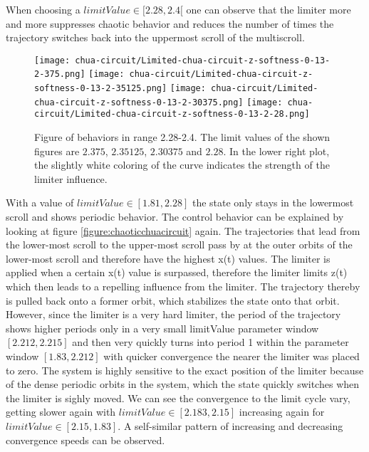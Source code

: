 \documentclass[main]{subfiles}
\begin{document}
When choosing a \(limitValue \in [2.28,2.4[\) one can observe that the limiter more and more suppresses chaotic behavior and reduces the number of times the trajectory switches back into the uppermost scroll of the multiscroll.

\begin{figure}[H]
\centering
\texttt{[image: chua-circuit/Limited-chua-circuit-z-softness-0-13-2-375.png]}
\texttt{[image: chua-circuit/Limited-chua-circuit-z-softness-0-13-2-35125.png]}
\texttt{[image: chua-circuit/Limited-chua-circuit-z-softness-0-13-2-30375.png]}
\texttt{[image: chua-circuit/Limited-chua-circuit-z-softness-0-13-2-28.png]}
\caption[Figure of behaviors in range 2.28-2.4]{Figure of behaviors in range 2.28-2.4. The limit values of the shown figures are \(2.375\), \(2.35125\), \(2.30375\) and \(2.28\). In the lower right plot, the slightly white coloring of the curve indicates the strength of the limiter influence.}
\label{figure:z-2.28-2.4-chaotictrajectories}
\end{figure}

With a value of \(limitValue \in [1.81, 2.28]\) the state only stays in the lowermost scroll and shows periodic behavior. The control behavior can be explained by looking at figure \ref{figure:chaoticchuacircuit} again. The trajectories that lead from the lower-most scroll to the upper-most scroll pass by at the outer orbits of the lower-most scroll and therefore have the highest x(t) values. The limiter is applied when a certain x(t) value is surpassed, therefore the limiter limits z(t) which then leads to a repelling influence from the limiter. The trajectory thereby is pulled back onto a former orbit, which stabilizes the state onto that orbit. However, since the limiter is a very hard limiter, the period of the trajectory shows higher periods only in a very small limitValue parameter window \([2.212,2.215]\) and then very quickly turns into period 1 within the parameter window \([1.83,2.212]\) with quicker convergence the nearer the limiter was placed to zero. The system is highly sensitive to the exact position of the limiter because of the dense periodic orbits in the system, which the state quickly switches when the limiter is sighly moved. We can see the convergence to the limit cycle vary, getting slower again with \(limitValue \in [2.183,2.15]\) increasing again for \(limitValue \in [2.15,1.83]\). A self-similar pattern of increasing and decreasing convergence speeds can be observed.
\end{document}
